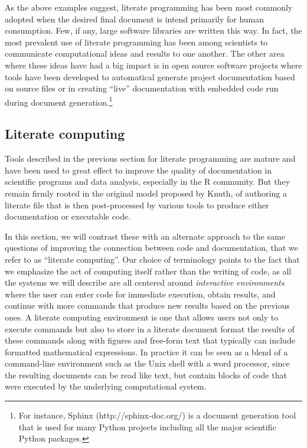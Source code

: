 \documentclass[ChapterTOCs,krantz2]{krantz} %
\theoremstyle{definition}
\begin{document}
As the above examples suggest, literate programming has been most commonly
adopted when the desired final document is intend primarily for human
consumption.  Few, if any, large software libraries are written this way.
In fact, the most prevalent use of literate programming has been among
scientists to communicate computational ideas and results to one another.
The other area where these ideas have had a big impact is in open source
software projects where tools have been developed to automatical generate
project documentation based on source files or in creating ``live''
documentation with embedded code run during document generation.\footnote{
For instance, Sphinx (http://sphinx-doc.org/) is a document generation tool
that is used for many Python projects including all the major scientific
Python packages.} 

\subsection{Literate computing}

Tools described in the previous section for literate programming are mature and
have been used to great effect to improve the quality of documentation in
scientific programs and data analysis, especially in the R community.  But they
remain firmly rooted in the original model proposed by Knuth, of authoring a
literate file that is then post-processed by various tools to produce either
documentation or executable code.  

In this section, we will contrast these with an alternate approach to the same
questions of improving the connection between code and documentation, that we
refer to as ``literate computing''.  Our choice of terminology points to the
fact that we emphasize the act of computing itself rather than the writing of
code, as all the systems we will describe are all centered around
\emph{interactive environments} where the user can enter code for immediate
execution, obtain results, and continue with more commands that produce new
results based on the previous ones.  A literate computing environment is one
that allows users not only to execute commands but also to store in a literate
document format the results of these commands along with figures and free-form
text that typically can include formatted mathematical expressions.  In
practice it can be seen as a blend of a command-line environment such as the
Unix shell with a word processor, since the resulting documents can be read
like text, but contain blocks of code that were executed by the underlying
computational system.
\end{document}
